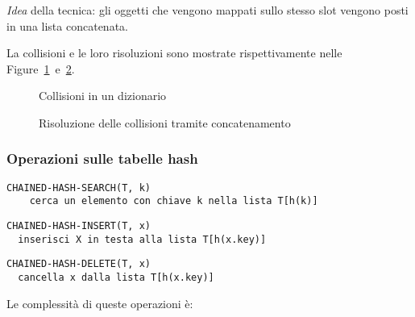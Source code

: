\documentclass[italian, 10pt]{article}
\begin{document}
\textit{Idea} della tecnica: gli oggetti che vengono mappati sullo stesso slot vengono posti in una lista concatenata.

\bigskip
La collisioni e le loro risoluzioni sono mostrate rispettivamente nelle Figure~\ref{fig:collisioni-dizionario}~e~\ref{fig:risoluzione-collisioni-dizionario}.

\begin{figure}[htbp]
  \bigskip
  \centering
  \caption{Collisioni in un dizionario}
  \label{fig:collisioni-dizionario}
  \bigskip
\end{figure}

\begin{figure}[htbp]
  \bigskip
  \centering
  \caption{Risoluzione delle collisioni tramite concatenamento}
  \label{fig:risoluzione-collisioni-dizionario}
  \bigskip
\end{figure}

\subsubsection{Operazioni sulle tabelle hash}

\begin{lstlisting}[style=pseudocode, caption={Ricerca}, label={lst:chained-hash-search}]
  CHAINED-HASH-SEARCH(T, k)
    cerca un elemento con chiave k nella lista T[h(k)]
  \end{lstlisting}

\begin{minipage}{\textwidth}
  \begin{lstlisting}[style=pseudocode, caption={Inserimento}, label={lst:chained-hash-insert}]
CHAINED-HASH-INSERT(T, x)
  inserisci X in testa alla lista T[h(x.key)]
\end{lstlisting}

  \begin{lstlisting}[style=pseudocode, caption={Cancellazione}, label={lst:chained-hash-delete}]
CHAINED-HASH-DELETE(T, x)
  cancella x dalla lista T[h(x.key)]
\end{lstlisting}
\end{minipage}

Le complessità di queste operazioni è:
\end{document}
